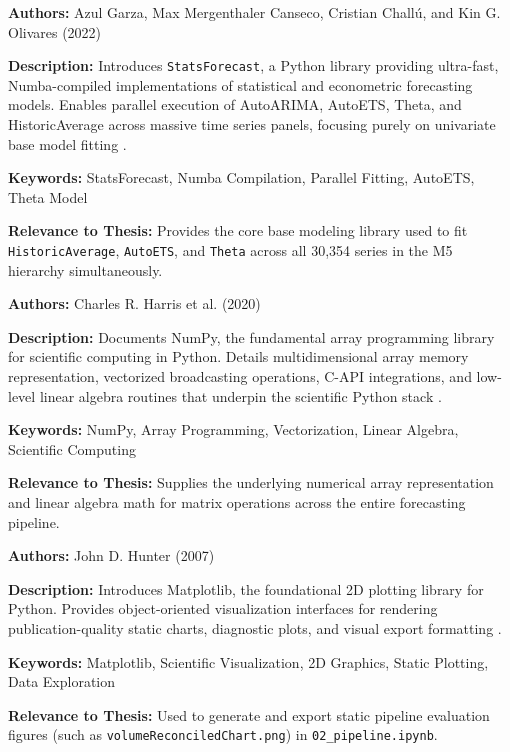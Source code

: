 {

	\textbf{Authors:}
	Azul Garza, Max Mergenthaler Canseco, Cristian Chall\'u, and Kin G. Olivares (2022)

	\textbf{Description:}
	Introduces \texttt{StatsForecast}, a Python library providing ultra-fast, Numba-compiled implementations of statistical and econometric forecasting models. Enables parallel execution of AutoARIMA, AutoETS, Theta, and HistoricAverage across massive time series panels, focusing purely on univariate base model fitting \autocite{Garza:2022}.

	\textbf{Keywords:}
	StatsForecast, Numba Compilation, Parallel Fitting, AutoETS, Theta Model

	\textbf{Relevance to Thesis:}
	Provides the core base modeling library used to fit \texttt{HistoricAverage}, \texttt{AutoETS}, and \texttt{Theta} across all 30,354 series in the M5 hierarchy simultaneously.

}

{

	\textbf{Authors:}
	Charles R. Harris et al. (2020)

	\textbf{Description:}
	Documents NumPy, the fundamental array programming library for scientific computing in Python. Details multidimensional array memory representation, vectorized broadcasting operations, C-API integrations, and low-level linear algebra routines that underpin the scientific Python stack \autocite{Harris:2020}.

	\textbf{Keywords:}
	NumPy, Array Programming, Vectorization, Linear Algebra, Scientific Computing

	\textbf{Relevance to Thesis:}
	Supplies the underlying numerical array representation and linear algebra math for matrix operations across the entire forecasting pipeline.

}

{

	\textbf{Authors:}
	John D. Hunter (2007)

	\textbf{Description:}
	Introduces Matplotlib, the foundational 2D plotting library for Python. Provides object-oriented visualization interfaces for rendering publication-quality static charts, diagnostic plots, and visual export formatting \autocite{Hunter:2007}.

	\textbf{Keywords:}
	Matplotlib, Scientific Visualization, 2D Graphics, Static Plotting, Data Exploration

	\textbf{Relevance to Thesis:}
	Used to generate and export static pipeline evaluation figures (such as \texttt{volumeReconciledChart.png}) in \texttt{02\_pipeline.ipynb}.

}

